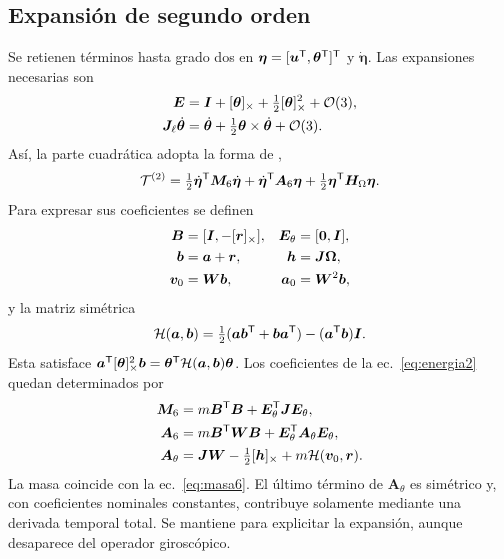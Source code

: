 \subsection{Expansión de segundo orden}
Se retienen términos hasta grado dos en $\bm\eta=[\bm u^\mathsf T,\bm\theta^\mathsf T]^\mathsf T$ y $\dot{\bm\eta}$. Las expansiones necesarias son
\begin{align}
\bm E&=\bm I+[\bm{\theta}]_\times+\tfrac12[\bm{\theta}]_\times^2+\mathcal O(3),\nonumber\\
\bm J_\ell\dot{\bm\theta}&=\dot{\bm\theta}
+\tfrac12\bm\theta\times\dot{\bm\theta}+\mathcal O(3).
\end{align}
Así, la parte cuadrática adopta la forma de \citet{meirovitch1997},
\begin{equation}
\mathcal T^{(2)}=\tfrac12\dot{\bm\eta}^\mathsf T\bm M_6\dot{\bm\eta}
+\dot{\bm\eta}^\mathsf T\bm A_6\bm\eta
+\tfrac12\bm\eta^\mathsf T\bm H_\Omega\bm\eta.
\label{apx:eq:T2}
\end{equation}
Para expresar sus coeficientes se definen
\begin{align}
\bm B&=[\bm I,-[\bm{r}]_\times],&\bm E_\theta&=[\bm0,\bm I],\nonumber\\
\bm b&=\bm a+\bm r,&\bm h&=\bm J\bm\Omega,\nonumber\\
\bm v_0&=\bm W\bm b,&\bm a_0&=\bm W^2\bm b,
\end{align}
y la matriz simétrica
\begin{equation}
\mathcal H(\bm a,\bm b)=\tfrac12(\bm a\bm b^\mathsf T+\bm b\bm a^\mathsf T)
-(\bm a^\mathsf T\bm b)\bm I.
\end{equation}
Esta satisface $\bm a^\mathsf T[\bm{\theta}]_\times^2\bm b=\bm\theta^\mathsf T\mathcal H(\bm a,\bm b)\bm\theta$. Los coeficientes de la ec.~\eqref{eq:energia2} quedan determinados por
\begin{align}
\bm M_6&=m\bm B^\mathsf T\bm B+\bm E_\theta^\mathsf T\bm J\bm E_\theta,\label{apx:eq:M6}\\
\bm A_6&=m\bm B^\mathsf T\bm W\bm B+\bm E_\theta^\mathsf T\bm A_\theta\bm E_\theta,\nonumber\\
\bm A_\theta&=\bm J\bm W-\tfrac12[\bm{h}]_\times+m\mathcal H(\bm v_0,\bm r).
\label{apx:eq:A6}
\end{align}
La masa coincide con la ec.~\eqref{eq:masa6}. El último término de $\bm A_\theta$ es simétrico y, con coeficientes nominales constantes, contribuye solamente mediante una derivada temporal total. Se mantiene para explicitar la expansión, aunque desaparece del operador giroscópico.

